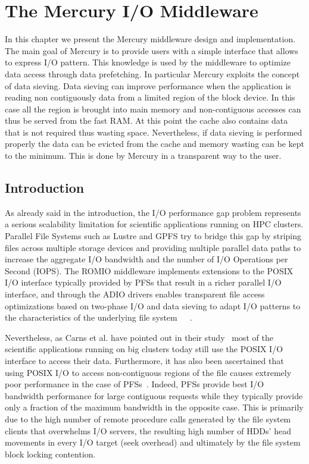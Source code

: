 \chapter{The Mercury I/O Middleware}
In this chapter we present the Mercury middleware design and implementation. The main goal of Mercury is to provide users with a simple interface that allows to express I/O pattern. This knowledge is used by the middleware
to optimize data access through data prefetching. In particular Mercury exploits the concept of data sieving. Data sieving can improve performance when the application is reading non contiguously data from a limited region
of the block device. In this case all the region is brought into main memory and non-contiguous accesses can thus be served from the fast RAM. At this point the cache also contains data that is not required thus wasting
space. Nevertheless, if data sieving is performed properly the data can be evicted from the cache and memory wasting can be kept to the minimum. This is done by Mercury in a transparent way to the user.

\section{Introduction}
\label{sec: motivation}
As already said in the introduction, the I/O performance gap problem represents a serious scalability limitation for scientific applications running on HPC clusters. Parallel File Systems such as Lustre and GPFS try to bridge this gap by striping 
files across multiple storage devices and providing multiple parallel data paths to increase the aggregate I/O bandwidth and the number of I/O Operations per Second (IOPS). The ROMIO middleware implements extensions to the POSIX I/O interface typically 
provided by PFSs that result in a richer parallel I/O interface, and through the ADIO drivers enables transparent file access optimizations based on two-phase I/O and data sieving to adapt I/O patterns to the characteristics of the underlying file 
system~\cite{ThakurGL99}~\cite{Ying08}~\cite{ProstTHKW00}.

Nevertheless, as Carns et al. have pointed out in their study~\cite{CarnsHABLLR11} most of the scientific applications running on big clusters today still use the POSIX I/O interface to access their data. Furthermore, it has also been ascertained 
that using POSIX I/O to access non-contiguous regions of the file causes extremely poor performance in the case of PFSs~\cite{ChingCLP06}. Indeed, PFSs provide best I/O bandwidth performance for large contiguous requests while they typically provide 
only a fraction of the maximum bandwidth in the opposite case. This is primarily due to the high number of remote procedure calls generated by the file system clients that overwhelms I/O servers, the resulting high number of HDDs' head movements in 
every I/O target (seek overhead) and ultimately by the file system block locking contention.

